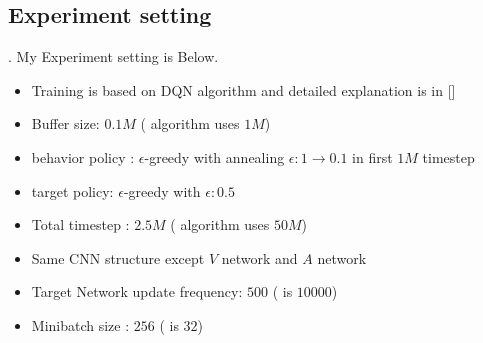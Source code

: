 \documentclass[8pt]{beamer}
\begin{document}
\subsection{Experiment setting}


\begin{frame}{.}
    My Experiment setting is Below. 
    \begin{itemize}
        \item Training is based on DQN algorithm and detailed explanation is in [\cite{mnih2015human}]
        \item Buffer size: $0.1M$ (\cite{mnih2015human} algorithm uses $1M$)
        \item behavior policy : $\epsilon$-greedy with annealing $\epsilon : 1 \rightarrow 0.1$ in first $1M$ timestep
        \item target policy: $\epsilon$-greedy with $\epsilon: 0.5$
        \item Total timestep : $2.5M$ (\cite{mnih2015human} algorithm uses $50M$)
        \item Same CNN structure except $V$ network and $A$ network
        \item Target Network update frequency: $500$ (\cite{mnih2015human} is $10000$)
        \item Minibatch size : $256$ (\cite{mnih2015human} is $32$)
    \end{itemize}
\end{frame}
\end{document}
